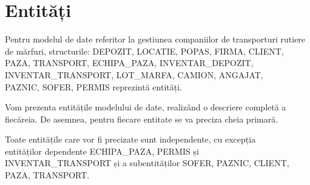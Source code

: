 \documentclass[12pt, a4paper]{article}
\begin{document}
\section{Entități}
\quad \par
Pentru modelul de date referitor la gestiunea companiilor de transporturi rutiere de mărfuri, structurile: DEPOZIT, LOCATIE, POPAS, FIRMA, CLIENT, PAZA, TRANSPORT, ECHIPA\_PAZA, INVENTAR\_DEPOZIT, INVENTAR\_TRANSPORT, LOT\_MARFA, CAMION, ANGAJAT,\\ PAZNIC, SOFER, PERMIS reprezintă entități.

Vom prezenta entitățile modelului de date, realizând o descriere completă a fiecăreia. De asemnea, pentru fiecare entitate se va preciza cheia primară.

Toate entitățile care vor fi precizate sunt independente, cu excepția\\ entităților dependente ECHIPA\_PAZA, PERMIS și\\ INVENTAR\_TRANSPORT
și a subentităților SOFER, PAZNIC, CLIENT, PAZA, TRANSPORT.
\end{document}

